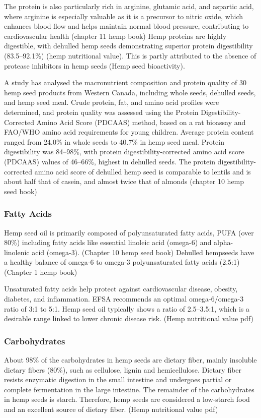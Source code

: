 \vspace{1em}
The protein is also particularly rich in arginine, glutamic acid, and aspartic acid, where arginine is especially valuable as it is a precursor to nitric oxide, which enhances blood flow and helps maintain normal blood pressure, contributing to cardiovascular health (chapter 11 hemp book)
Hemp proteins are highly digestible, with dehulled hemp seeds demonstrating superior protein digestibility (83.5–92.1\%) (hemp nutritional value). This is partly attributed to the absence of protease inhibitors in hemp seeds (Hemp seed bioactivity). 

\vspace{1em}
A study has analysed the macronutrient composition and protein quality of 30 hemp seed products from Western Canada, including whole seeds, dehulled seeds, and hemp seed meal. Crude protein, fat, and amino acid profiles were determined, and protein quality was assessed using the Protein Digestibility-Corrected Amino Acid Score (PDCAAS) method, based on a rat bioassay and FAO/WHO amino acid requirements for young children. Average protein content ranged from 24.0\% in whole seeds to 40.7\% in hemp seed meal. Protein digestibility was 84–98\%, with protein digestibility-corrected amino acid score (PDCAAS) values of 46–66\%, highest in dehulled seeds. The protein digestibility-corrected amino acid score of dehulled hemp seed is comparable to lentils and is about half that of casein, and almost twice that of almonds (chapter 10 hemp seed book)

\subsubsection{Fatty Acids}
Hemp seed oil is primarily composed of polyunsaturated fatty acids, PUFA (over 80\%) including fatty acids like essential linoleic acid (omega-6) and alpha-linolenic acid (omega-3). (Chapter 10 hemp seed book) Dehulled hempseeds have a healthy balance of omega-6 to omega-3 polyunsaturated fatty acids (2.5:1) (Chapter 1 hemp book)

\vspace{1em}
Unsaturated fatty acids help protect against cardiovascular disease, obesity, diabetes, and inflammation. EFSA recommends an optimal omega-6/omega-3 ratio of 3:1 to 5:1. Hemp seed oil typically shows a ratio of 2.5–3.5:1, which is a desirable range linked to lower chronic disease risk. (Hemp nutritional value pdf)

\subsubsection{Carbohydrates}
About 98\% of the carbohydrates in hemp seeds are dietary fiber, mainly insoluble dietary fibers (80\%), such as cellulose, lignin and hemicellulose. Dietary fiber resists enzymatic digestion in the small intestine and undergoes partial or complete fermentation in the large intestine. The remainder of the carbohydrates in hemp seeds is starch. Therefore, hemp seeds are considered a low-starch food and an excellent source of dietary fiber. (Hemp nutritional value pdf) 

